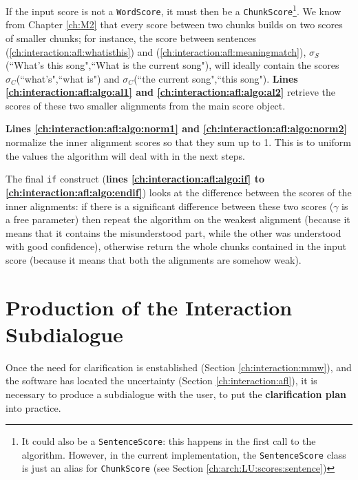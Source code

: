 If the input score is not a \texttt{WordScore}, it must then be a \texttt{ChunkScore}\footnote{It could also be a \texttt{SentenceScore}: this happens in the first call to the algorithm. However, in the current implementation, the \texttt{SentenceScore} class is just an alias for \texttt{ChunkScore} (see Section \ref{ch:arch:LU:scores:sentence})}. We know from Chapter \ref{ch:M2} that every score between two chunks builds on two scores of smaller chunks; for instance, the score between sentences (\ref{ch:interaction:afl:whatisthis}) and (\ref{ch:interaction:afl:meaningmatch}), $\sigma_S$(``What's this song",``What is the current song"), will ideally contain the scores $\sigma_C$(``what's",``what is") and $\sigma_C$(``the current song",``this song"). \textbf{Lines \ref{ch:interaction:afl:algo:al1} and \ref{ch:interaction:afl:algo:al2}} retrieve the scores of these two smaller alignments from the main score object.

\textbf{Lines \ref{ch:interaction:afl:algo:norm1} and \ref{ch:interaction:afl:algo:norm2}} normalize the inner alignment scores so that they sum up to 1. This is to uniform the values the algorithm will deal with in the next steps.

The final \texttt{if} construct (\textbf{lines \ref{ch:interaction:afl:algo:if} to \ref{ch:interaction:afl:algo:endif}}) looks at the difference between the scores of the inner alignments: if there is a significant difference between these two scores ($\gamma$ is a free parameter) then repeat the algorithm on the weakest alignment (because it means that it contains the misunderstood part, while the other was understood with good confidence), otherwise return the whole chunks contained in the input score (because it means that both the alignments are somehow weak).


\section{Production of the Interaction Subdialogue} \label{ch:interaction:episode}
Once the need for clarification is enstablished (Section \ref{ch:interaction:mmw}), and the software has located the uncertainty (Section \ref{ch:interaction:afl}), it is necessary to produce a subdialogue with the user, to put the \textbf{clarification plan} into practice.

